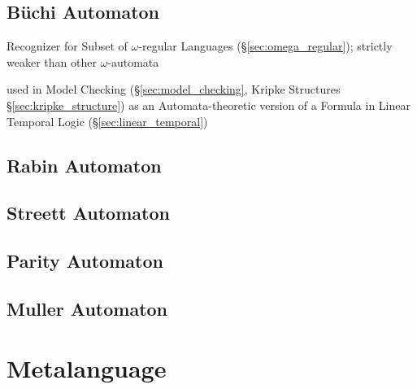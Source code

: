 \subsection{B\"uchi Automaton}\label{sec:buchi_automaton}

Recognizer for Subset of $\omega$-regular Languages
(\S\ref{sec:omega_regular}); strictly weaker than other
$\omega$-automata

used in Model Checking (\S\ref{sec:model_checking}, Kripke Structures
\S\ref{sec:kripke_structure}) as an Automata-theoretic version of a
Formula in Linear Temporal Logic (\S\ref{sec:linear_temporal})



\subsection{Rabin Automaton}\label{sec:rabin_automaton}

\subsection{Streett Automaton}\label{sec:streett_automaton}

\subsection{Parity Automaton}\label{sec:parity_automaton}

\subsection{Muller Automaton}\label{sec:muller_automaton}



\section{Metalanguage}\label{sec:metalanguage}

